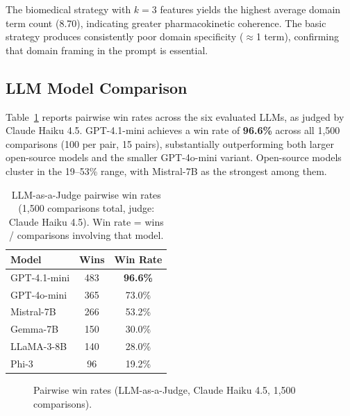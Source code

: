 \documentclass[a4paper, 11pt]{article}
\begin{document}
The biomedical strategy with $k=3$ features yields the highest average
domain term count (8.70), indicating greater pharmacokinetic coherence.
The basic strategy produces consistently poor domain specificity ($\approx$1
term), confirming that domain framing in the prompt is essential.

\subsection{LLM Model Comparison}

Table~\ref{tab:judge} reports pairwise win rates across the six evaluated
LLMs, as judged by Claude Haiku 4.5. GPT-4.1-mini achieves a win rate of
\textbf{96.6\%} across all 1{,}500 comparisons (100 per pair, 15 pairs),
substantially outperforming both larger open-source models and the smaller
GPT-4o-mini variant. Open-source models cluster in the 19--53\% range,
with Mistral-7B as the strongest among them.

\begin{table}[H]
  \centering
  \caption{LLM-as-a-Judge pairwise win rates (1{,}500 comparisons total,
    judge: Claude Haiku 4.5). Win rate = wins / comparisons involving that model.}
  \label{tab:judge}
  \begin{tabular}{lcc}
    \hline
    \textbf{Model} & \textbf{Wins} & \textbf{Win Rate} \\
    \hline
    GPT-4.1-mini   & 483 & \textbf{96.6\%} \\
    GPT-4o-mini    & 365 & 73.0\% \\
    Mistral-7B     & 266 & 53.2\% \\
    Gemma-7B       & 150 & 30.0\% \\
    LLaMA-3-8B     & 140 & 28.0\% \\
    Phi-3          &  96 & 19.2\% \\
    \hline
  \end{tabular}
\end{table}

\begin{figure}[H]
  \centering
  \caption{Pairwise win rates (LLM-as-a-Judge, Claude Haiku 4.5, 1{,}500 comparisons).}
  \label{fig:model_comparison}
\end{figure}
\end{document}
